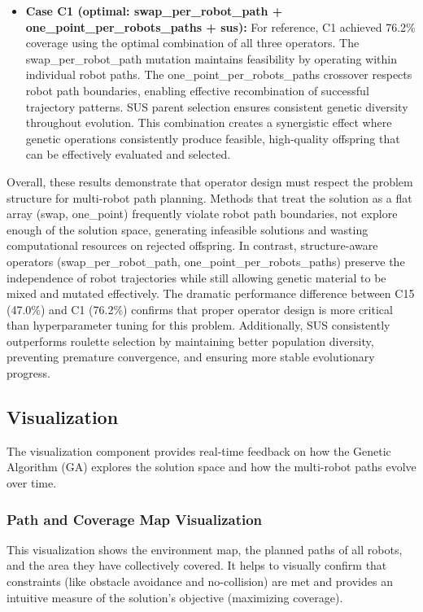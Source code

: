 \begin{itemize}
    \item \textbf{Case C1 (optimal: swap\_per\_robot\_path + one\_point\_per\_robots\_paths + sus):}
    For reference, C1 achieved 76.2\% coverage using the optimal combination of all three operators.
    The swap\_per\_robot\_path mutation maintains feasibility by operating within individual robot paths.
    The one\_point\_per\_robots\_paths crossover respects robot path boundaries, enabling effective recombination of successful trajectory patterns.
    SUS parent selection ensures consistent genetic diversity throughout evolution.
    This combination creates a synergistic effect where genetic operations consistently produce feasible, high-quality offspring that can be effectively evaluated and selected.
    
\end{itemize}

Overall, these results demonstrate that operator design must respect the problem structure for multi-robot path planning. 
Methods that treat the solution as a flat array (swap, one\_point) frequently violate robot path boundaries, not explore enough of the solution space, generating infeasible solutions and wasting computational resources on rejected offspring.
In contrast, structure-aware operators (swap\_per\_robot\_path, one\_point\_per\_robots\_paths) preserve the independence of robot trajectories while still allowing genetic material to be mixed and mutated effectively.
The dramatic performance difference between C15 (47.0\%) and C1 (76.2\%) confirms that proper operator design is more critical than hyperparameter tuning for this problem.
Additionally, SUS consistently outperforms roulette selection by maintaining better population diversity, preventing premature convergence, and ensuring more stable evolutionary progress.



\subsection{Visualization}

The visualization component provides real-time feedback on how the Genetic Algorithm (GA) explores the solution space and how the multi-robot paths evolve over time.

\subsubsection{Path and Coverage Map Visualization}
This visualization shows the environment map, the planned paths of all robots, and the area they have collectively covered. It helps to visually confirm that constraints (like obstacle avoidance and no-collision) are met and provides an intuitive measure of the solution's objective (maximizing coverage).

